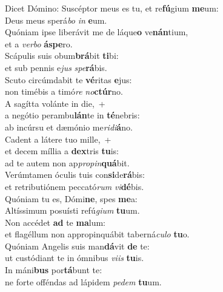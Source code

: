 \evenverse Dicet Dómino: Suscéptor meus es tu, et re\textbf{fú}gium \textbf{me}um:~\*\\
\evenverse Deus meus sperá\textit{bo} \textit{in} \textbf{e}um.\\
\oddverse Quóniam ipse liberávit me de láque\textbf{o} ve\textbf{nán}tium,~\*\\
\oddverse et a \textit{ver}\textit{bo} \textbf{á}\textbf{spe}ro.\\
\evenverse Scápulis suis obum\textbf{brá}bit \textbf{ti}bi:~\*\\
\evenverse et sub pennis e\textit{jus} \textit{spe}\textbf{rá}bis.\\
\oddverse Scuto circúmdabit te \textbf{vé}ritas \textbf{e}jus:~\*\\
\oddverse non timébis a timó\textit{re} \textit{no}\textbf{ctúr}no.\\
\evenverse A sagítta volánte in die,~+\\
\evenverse  a negótio perambu\textbf{lán}te in \textbf{té}nebris:~\*\\
\evenverse ab incúrsu et dæmónio me\textit{ri}\textit{di}\textbf{á}no.\\
\oddverse Cadent a látere tuo mille,~+\\
\oddverse  et decem míllia a \textbf{dex}tris \textbf{tu}is:~\*\\
\oddverse ad te autem non ap\textit{pro}\textit{pin}\textbf{quá}bit.\\
\evenverse Verúmtamen óculis tuis con\textbf{si}de\textbf{rá}bis:~\*\\
\evenverse et retributiónem peccató\textit{rum} \textit{vi}\textbf{dé}bis.\\
\oddverse Quóniam tu es, Dómi\textbf{ne}, spes \textbf{me}a:~\*\\
\oddverse Altíssimum posuísti refú\textit{gi}\textit{um} \textbf{tu}um.\\
\evenverse Non accédet \textbf{ad} te \textbf{ma}lum:~\*\\
\evenverse et flagéllum non appropinquábit taberná\textit{cu}\textit{lo} \textbf{tu}o.\\
\oddverse Quóniam Angelis suis man\textbf{dá}vit \textbf{de} te:~\*\\
\oddverse ut custódiant te in ómnibus \textit{vi}\textit{is} \textbf{tu}is.\\
\evenverse In máni\textbf{bus} por\textbf{tá}bunt te:~\*\\
\evenverse ne forte offéndas ad lápidem \textit{pe}\textit{dem} \textbf{tu}um.\\
